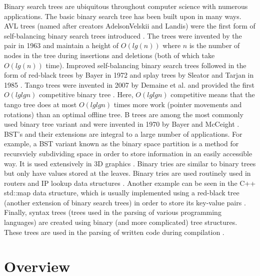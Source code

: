 \documentclass[letterpaper,12pt,titlepage,oneside,final]{book}
\theoremstyle{plain}
\begin{document}
Binary search trees are ubiquitous throughout computer science with numerous applications. The basic binary search tree has been built upon in many ways. AVL trees (named after creators AdelsonVelskii and Landis) were the first form of self-balancing binary search trees introduced \cite{adelsonvelskii1963algorithm}. The trees were invented by the pair in 1963 and maintain a height of $O(lg(n))$ where $n$ is the number of nodes in the tree during insertions and deletions (both of which take $O(lg(n))$ time). Improved self-balancing binary search trees followed in the form of red-black trees by Bayer in 1972 and splay trees by Sleator and Tarjan in 1985 \cite{bayer1972symmetric} \cite{sleator1985self}. Tango trees were invented in 2007 by Demaine et al. and provided the first $O(lg lg n)$ competitive binary tree \cite{demaine2007dynamic}. Here, $O(lg lg n)$ competitive means that the tango tree does at most $O(lg lg n)$ times more work (pointer movements and rotations) than an optimal offline tree. B trees are among the most commonly used binary tree variant and were invented in 1970 by Bayer and McCeight \cite{bayer1970organization}. \\

BST's and their extensions are integral to a large number of applications. For example, a BST variant known as the binary space partition is a method for recursviely subdividing space in order to store information in an easily accessible way. It is used extensively in 3D graphics \cite{schumacker1969study} \cite{paterson1992optimal}. Binary tries are similar to binary trees but only have values stored at the leaves. Binary tries are used routinely used in routers and IP lookup data structures \cite{song2010building}. Another example can be seen in the C++ std::map data structure, which is usually implemented using a red-black tree (another extension of binary search trees) in order to store its key-value pairs \cite{CppMap}. Finally, syntax trees (trees used in the parsing of various programming languages) are created using binary (and more complicated) tree structures. These trees are used in the parsing of written code during compilation \cite{louden1997compiler}.

\section{Overview}
\end{document}

